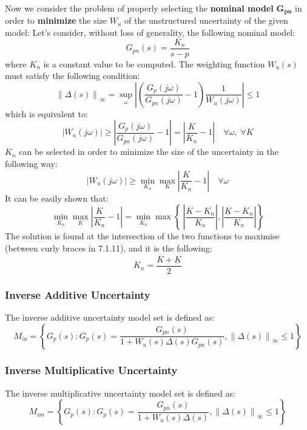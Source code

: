 \documentclass{article}
\numberwithin{equation}{subsection}
\begin{document}
	\raggedright
	Now we consider the problem of properly selecting the \textbf{nominal model} $\bm{G_{pn}}$ in order to \textbf{minimize} the size $W_u$ of the unstructured uncertainty of the given model:
	Let's consider, without loss of generality, the following nominal model:
	\begin{equation}
		G_{pn}(s) = \dfrac{K_n}{s-p}
	\end{equation}
	where $K_n$ is a constant value to be computed.
	The weighting function $W_u(s)$ must satisfy the following condition:
	\begin{equation}
		\left\lVert \Delta(s) \right\rVert_\infty = \sup_\omega \left| \left( \dfrac{G_p(j\omega)}{G_{pn}(j\omega)}-1 \right) \dfrac{1}{W_u(j\omega)} \right| \leq 1
	\end{equation}
	which is equivalent to:
	\begin{equation}
		\left| W_u(j\omega) \right| \geq \left| \dfrac{G_p(j\omega)}{G_{pn}(j\omega)}-1 \right| = \left| \dfrac{K}{K_n}-1 \right| \quad \forall\omega,\;\forall K 
	\end{equation}
	$K_n$ can be selected in order to minimize the size of the uncertainty in the following way:
	\begin{equation}
		\left| W_u(j\omega) \right| \geq \min_{K_n}\max_K \left| \dfrac{K}{K_n}-1 \right| \quad \forall\omega
	\end{equation}
	It can be easily shown that:
	\begin{equation}
		\min_{K_n}\max_K \left| \dfrac{K}{K_n}-1 \right| = \min_{K_n}\max \left\{\ \left| \dfrac{\overline{K}-K_n}{K_n} \right|, \left| \dfrac{\underline{K}-K_n}{K_n} \right| \right\}
	\end{equation}
	The solution is found at the intersection of the two functions to maximise (between curly braces in 7.1.11), and it is the following:
	\begin{equation}
		K_n = \dfrac{\overline{K}+\underline{K}}{2}
	\end{equation}
	
	\subsubsection{Inverse Additive Uncertainty}
	The inverse additive uncertainty model set is defined as:
	\begin{equation}
		M_{ia} = \left\{ G_p(s): G_p(s)= \dfrac{G_{pn}(s)}{1+W_u(s)\Delta(s)G_{pn}(s)}, \left\lVert\Delta(s)\right\rVert_\infty \leq1 \right\}
	\end{equation}
	\subsubsection{Inverse Multiplicative Uncertainty}
	The inverse multiplicative uncertainty model set is defined as:
	\begin{equation}
		M_{im} = \left\{ G_p(s): G_p(s)= \dfrac{G_{pn}(s)}{1+W_u(s)\Delta(s)}, \left\lVert\Delta(s)\right\rVert_\infty \leq1 \right\}
	\end{equation}
	
\end{document}
